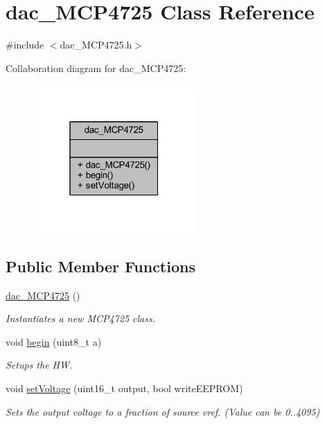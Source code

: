 \hypertarget{classdac___m_c_p4725}{}\section{dac\+\_\+\+M\+C\+P4725 Class Reference}
\label{classdac___m_c_p4725}


{\ttfamily \#include $<$dac\+\_\+\+M\+C\+P4725.\+h$>$}



Collaboration diagram for dac\+\_\+\+M\+C\+P4725\+:
\nopagebreak
\begin{figure}[H]
\begin{center}
\leavevmode
\includegraphics[width=175pt]{d8/dde/classdac___m_c_p4725__coll__graph}
\end{center}
\end{figure}
\subsection*{Public Member Functions}
\begin{DoxyCompactItemize}
\item 
\hyperlink{classdac___m_c_p4725_a1963bacd207b3c9618485427a706bc86}{dac\+\_\+\+M\+C\+P4725} ()
\begin{DoxyCompactList}\small\item\em Instantiates a new M\+C\+P4725 class. \end{DoxyCompactList}\item 
void \hyperlink{classdac___m_c_p4725_ad2a4a3342f561821e76388ad3849a0a7}{begin} (uint8\+\_\+t a)
\begin{DoxyCompactList}\small\item\em Setups the HW. \end{DoxyCompactList}\item 
void \hyperlink{classdac___m_c_p4725_a93548cddb90bd4f58c4fc3b53516fd08}{set\+Voltage} (uint16\+\_\+t output, bool write\+E\+E\+P\+R\+OM)
\begin{DoxyCompactList}\small\item\em Sets the output voltage to a fraction of source vref. (Value can be 0..4095) \end{DoxyCompactList}\end{DoxyCompactItemize}



